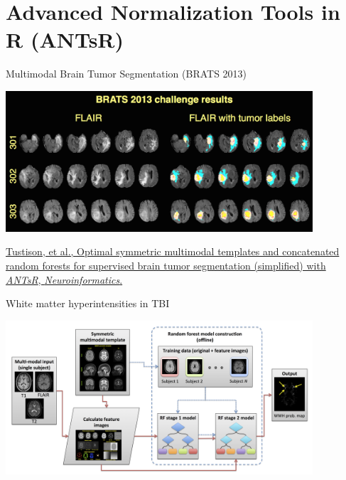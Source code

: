\documentclass[ignorenonframetext,]{beamer}
\begin{document}
\section{Advanced Normalization Tools in R
(ANTsR)}\label{advanced-normalization-tools-in-r-antsr}

\begin{frame}{Multimodal Brain Tumor Segmentation (BRATS 2013)}

\begin{centering}

\includegraphics[width=4.5in]{./competitions/figures/brats2013results1.png}

\end{centering}

\small

\href{http://www.ncbi.nlm.nih.gov/pubmed/25433513}{Tustison, et al.,
Optimal symmetric multimodal templates and concatenated random forests
for supervised brain tumor segmentation (simplified) with \emph{ANTsR},
\emph{Neuroinformatics}.}

\end{frame}

\begin{frame}{White matter hyperintensities in TBI}

\begin{centering}

\includegraphics[width=4.5in]{./wmhs/figures/wmhPipeline.png}

\end{centering}

\end{frame}
\end{document}
